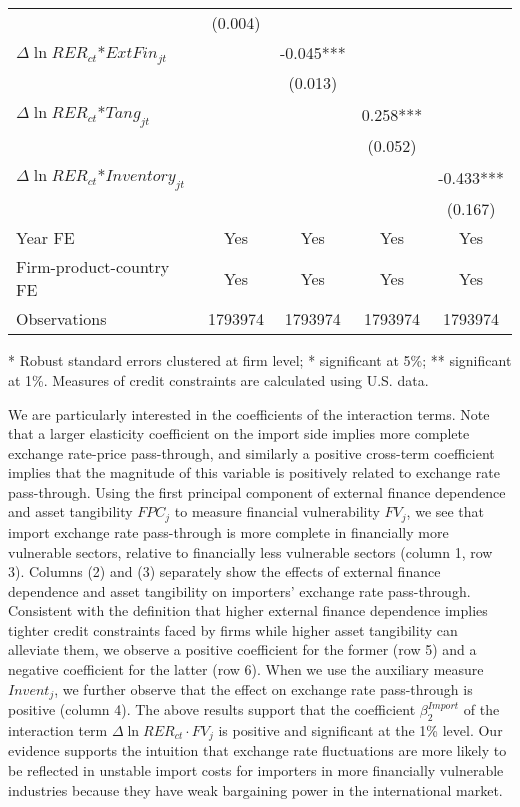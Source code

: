 \begin{table}[htbp]
\begin{threeparttable}
\begin{tabular}{lcccc}
		& (0.004) &       &       &  \\
		$\Delta \ln RER_{ct}$*$ExtFin_{jt}$ &       & -0.045*** &       &  \\
		&       & (0.013) &       &  \\
		$\Delta \ln RER_{ct}$*$Tang_{jt}$ &       &       & 0.258*** &  \\
		&       &       & (0.052) &  \\
		$\Delta \ln RER_{ct}$*$Inventory_{jt}$ &       &       &       & -0.433*** \\
		&       &       &       & (0.167) \\
		Year FE  & Yes   & Yes   & Yes   & Yes \\
		Firm-product-country FE & Yes   & Yes   & Yes   & Yes \\
		Observations & 1793974 & 1793974 & 1793974 & 1793974 \\
		\bottomrule
	\end{tabular}
	\label{tab5.2}
	\begin{tablenotes}
		\footnotesize
		\item[*] Robust standard errors clustered at firm level; * significant at 5\%; ** significant at 1\%. Measures of credit constraints are calculated using U.S. data.
	\end{tablenotes}
	\end{threeparttable}
\end{table}

We are particularly interested in the coefficients of the interaction terms. Note that a larger elasticity coefficient on the import side implies more complete exchange rate-price pass-through, and similarly a positive cross-term coefficient implies that the magnitude of this variable is positively related to exchange rate pass-through. Using the first principal component of external finance dependence and asset tangibility $FPC_j$ to measure financial vulnerability $FV_j$, we see that import exchange rate pass-through is more complete in financially more vulnerable sectors, relative to financially less vulnerable sectors (column 1, row 3). Columns (2) and (3) separately show the effects of external finance dependence and asset tangibility on importers' exchange rate pass-through. Consistent with the definition that higher external finance dependence implies tighter credit constraints faced by firms while higher asset tangibility can alleviate them, we observe a positive coefficient for the former (row 5) and a negative coefficient for the latter (row 6). When we use the auxiliary measure $Invent_j$, we further observe that the effect on exchange rate pass-through is positive (column 4). The above results support that the coefficient $\beta^{Import}_2$ of the interaction term $\Delta \ln RER_{ct} \cdot FV_{j}$ is positive and significant at the 1\% level. Our evidence supports the intuition that exchange rate fluctuations are more likely to be reflected in unstable import costs for importers in more financially vulnerable industries because they have weak bargaining power in the international market.

